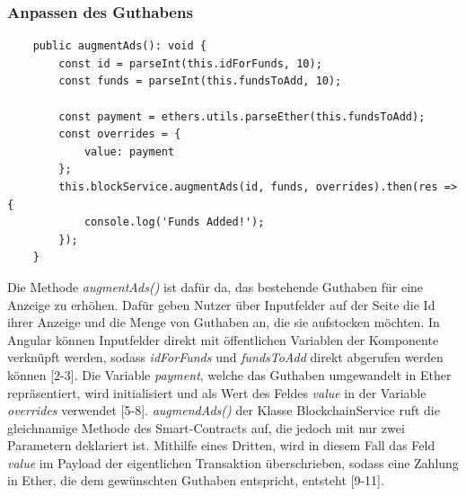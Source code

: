 \subsubsection{Anpassen des Guthabens}
\begin{lstlisting}
	public augmentAds(): void {
		const id = parseInt(this.idForFunds, 10);
		const funds = parseInt(this.fundsToAdd, 10);
		
		const payment = ethers.utils.parseEther(this.fundsToAdd);
		const overrides = {
			value: payment
		};
		this.blockService.augmentAds(id, funds, overrides).then(res => {
			console.log('Funds Added!');
		});
	}
\end{lstlisting}
Die Methode \emph{augmentAds()} ist dafür da, das bestehende Guthaben für eine Anzeige zu erhöhen. 
Dafür geben Nutzer über Inputfelder auf der Seite die Id ihrer Anzeige und die Menge von Guthaben an, die sie aufstocken möchten. 
In Angular können Inputfelder direkt mit öffentlichen Variablen der Komponente verknüpft werden, sodass \emph{idForFunds} und \emph{fundsToAdd} direkt abgerufen werden können [2-3]. Die Variable \emph{payment}, welche das Guthaben umgewandelt in Ether repräsentiert, wird initialisiert und als Wert des Feldes \emph{value} in der Variable \emph{overrides} verwendet [5-8]. \emph{augmendAds()} der Klasse BlockchainService ruft die gleichnamige Methode des Smart-Contracts auf, die jedoch mit nur zwei Parametern deklariert ist. Mithilfe eines Dritten, wird in diesem Fall das Feld \emph{value} im Payload der eigentlichen Transaktion überschrieben, sodass eine Zahlung in Ether, die dem gewünschten Guthaben entspricht, entsteht [9-11]. 
